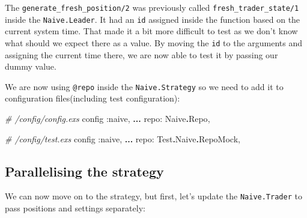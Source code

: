 \documentclass[
  oneside]{book}
\newenvironment{Shaded}{\begin{snugshade}}{\end{snugshade}}
\newcommand{\CommentTok}[1]{\textcolor[rgb]{0.56,0.35,0.01}{\textit{#1}}}
\newcommand{\ConstantTok}[1]{\textcolor[rgb]{0.56,0.35,0.01}{#1}}
\newcommand{\NormalTok}[1]{#1}
\newcommand{\OperatorTok}[1]{\textcolor[rgb]{0.81,0.36,0.00}{\textbf{#1}}}
\newcommand{\VariableTok}[1]{\textcolor[rgb]{0.00,0.00,0.00}{#1}}
\begin{document}
The \texttt{generate\_fresh\_position/2} was previously called \texttt{fresh\_trader\_state/1} inside the \texttt{Naive.Leader}. It had an \texttt{id} assigned inside the function based on the current system time. That made it a bit more difficult to test as we don't know what should we expect there as a value. By moving the \texttt{id} to the arguments and assigning the current time there, we are now able to test it by passing our dummy value.

We are now using \texttt{@repo} inside the \texttt{Naive.Strategy} so we need to add it to configuration files(including test configuration):

\begin{Shaded}
\begin{Highlighting}[]
\CommentTok{\# /config/config.exs}
\NormalTok{config }\VariableTok{:naive}\NormalTok{,}
  \OperatorTok{...}
  \VariableTok{repo:} \ConstantTok{Naive}\OperatorTok{.}\ConstantTok{Repo}\NormalTok{,}
\end{Highlighting}
\end{Shaded}

\begin{Shaded}
\begin{Highlighting}[]
\CommentTok{\# /config/test.exs}
\NormalTok{config }\VariableTok{:naive}\NormalTok{,}
  \OperatorTok{...}
  \VariableTok{repo:} \ConstantTok{Test}\OperatorTok{.}\ConstantTok{Naive}\OperatorTok{.}\ConstantTok{RepoMock}\NormalTok{,}
\end{Highlighting}
\end{Shaded}

\subsection{Parallelising the strategy}\label{parallelising-the-strategy}

We can now move on to the strategy, but first, let's update the \texttt{Naive.Trader} to pass positions and settings separately:
\end{document}
